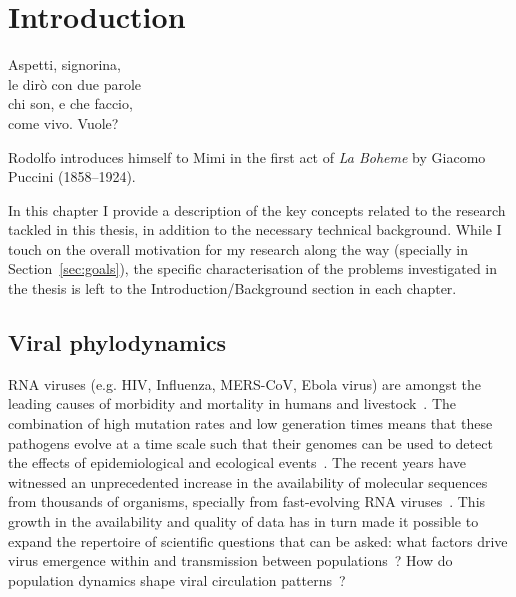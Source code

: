 \chapter{Introduction}
\epigraph{ 
Aspetti, signorina,\\
le dir\`{o} con due parole\\
chi son, e che faccio, \\
come vivo.  Vuole?%
}{Rodolfo introduces himself to Mimi in the first act of \textit{La Boheme} by Giacomo Puccini (1858--1924).}

In this chapter I provide a description of the key concepts related to the research tackled in this thesis, in addition to the necessary technical background.
While I touch on the overall motivation for my research along the way (specially in Section~\ref{sec:goals}), the specific characterisation of the problems investigated in the thesis is left to the Introduction/Background section in each chapter. 

\section{Viral phylodynamics}

RNA viruses (e.g. HIV, Influenza, MERS-CoV, Ebola virus) are amongst the leading causes of morbidity and mortality in humans and livestock~\citep{Woolhouse2002}.
The combination of high mutation rates and low generation times means that these pathogens evolve at a time scale such that their genomes can be used to detect the effects of epidemiological and ecological events~\citep{Drummond2003,Grenfell2004,Duffy2008,Pybus2009}.
The recent years have witnessed an unprecedented increase in the availability of molecular sequences from thousands of organisms, specially from fast-evolving RNA viruses~\citep{Benson2014}.
This growth in the availability and quality of data has in turn made it possible to expand the repertoire of scientific questions that can be asked: what factors drive virus emergence within and transmission between populations~\citep{Dudas2017,Dudas2018}? How do population dynamics shape viral circulation patterns~\citep{Volz2013,Bedford2015}?

